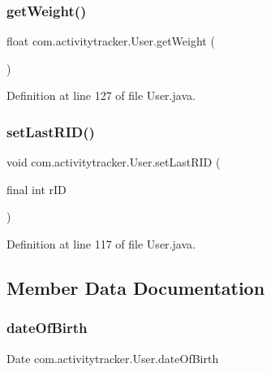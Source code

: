 \subsubsection{\texorpdfstring{get\+Weight()}{getWeight()}}
{\footnotesize\ttfamily float com.\+activitytracker.\+User.\+get\+Weight (\begin{DoxyParamCaption}{ }\end{DoxyParamCaption})}



Definition at line 127 of file User.\+java.

\mbox{\label{classcom_1_1activitytracker_1_1_user_a9e91c79596a9a4dfda7b3453b61ff8d2}} 
\subsubsection{\texorpdfstring{set\+Last\+R\+I\+D()}{setLastRID()}}
{\footnotesize\ttfamily void com.\+activitytracker.\+User.\+set\+Last\+R\+ID (\begin{DoxyParamCaption}\item[{final int}]{r\+ID }\end{DoxyParamCaption})}



Definition at line 117 of file User.\+java.



\subsection{Member Data Documentation}
\mbox{\label{classcom_1_1activitytracker_1_1_user_a40b0d4ce16246066c0e948edef864d94}} 
\subsubsection{\texorpdfstring{date\+Of\+Birth}{dateOfBirth}}
{\footnotesize\ttfamily Date com.\+activitytracker.\+User.\+date\+Of\+Birth\hspace{0.3cm}{\ttfamily [private]}}



